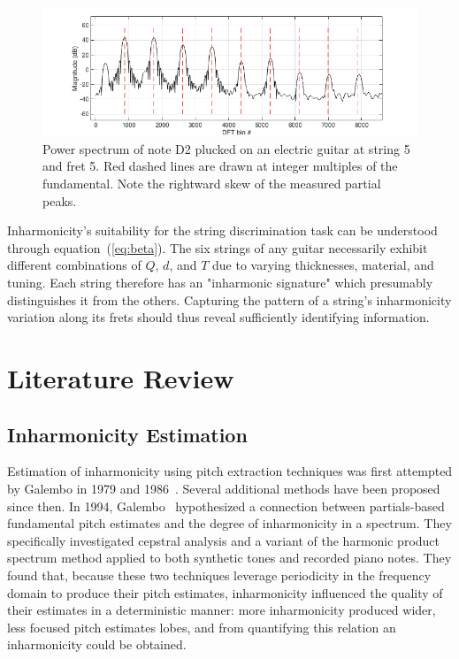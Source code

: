 \documentclass[12pt]{cmuthesis}
\begin{document}
\begin{figure}[h] \label{fig:skew}
\centering
\includegraphics[scale=0.65]{skew}
\caption{Power spectrum of note D2 plucked on an electric guitar at string 5 and fret 5. Red dashed lines are drawn at integer multiples of the fundamental. Note the rightward skew of the measured partial peaks.}
\end{figure}


Inharmonicity's suitability for the string discrimination task can be understood through equation~(\ref{eq:beta}). The six strings of any guitar necessarily exhibit different combinations of $Q$, $d$, and $T$ due to varying thicknesses, material, and tuning. Each string therefore has an "inharmonic signature" which presumably distinguishes it from the others. Capturing the pattern of a string's inharmonicity variation along its frets should thus reveal sufficiently identifying information.



\noindent
\chapter{Literature Review} \label{lit-review}
\section{Inharmonicity Estimation}
Estimation of inharmonicity using pitch extraction techniques was first attempted by Galembo in 1979 and 1986~\cite{galembo1979,galembo1987}. Several additional methods have been proposed since then. In 1994, Galembo~\cite{galembo1994} hypothesized a connection between partials-based fundamental pitch estimates and the degree of inharmonicity in a spectrum. They specifically investigated cepstral analysis and a variant of the harmonic product spectrum method applied to both synthetic tones and recorded piano notes. They found that, because these two techniques leverage periodicity in the frequency domain to produce their pitch estimates, inharmonicity influenced the quality of their estimates in a deterministic manner: more inharmonicity produced wider, less focused pitch estimates lobes, and from quantifying this relation an inharmonicity could be obtained.
 
\end{document}
